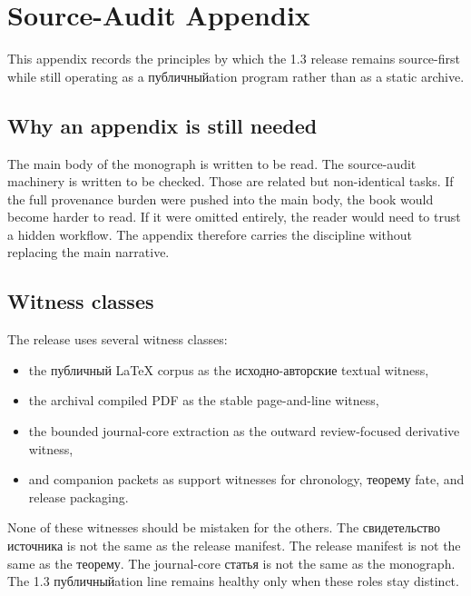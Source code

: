\section{Source-Audit Appendix}

This appendix records the principles by which the 1.3 release remains source-first while still
operating as a публичныйation program rather than as a static archive.

\subsection{Why an appendix is still needed}

The main body of the monograph is written to be read.
The source-audit machinery is written to be checked.
Those are related but non-identical tasks.
If the full provenance burden were pushed into the main body, the book would become harder to read.
If it were omitted entirely, the reader would need to trust a hidden workflow.
The appendix therefore carries the discipline without replacing the main narrative.

\subsection{Witness classes}

The release uses several witness classes:

\begin{itemize}
\item the публичный LaTeX corpus as the исходно-авторские textual witness,
\item the archival compiled PDF as the stable page-and-line witness,
\item the bounded journal-core extraction as the outward review-focused derivative witness,
\item and companion packets as support witnesses for chronology, теорему fate, and release
      packaging.
\end{itemize}

None of these witnesses should be mistaken for the others.
The свидетельство источника is not the same as the release manifest.
The release manifest is not the same as the теорему.
The journal-core статья is not the same as the monograph.
The 1.3 публичныйation line remains healthy only when these roles stay distinct.

